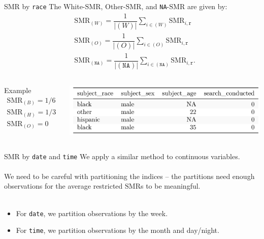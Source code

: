 \documentclass[11pt]{beamer}
\newcommand{\SMR}{\mathrm{SMR}}
\newcommand{\race}{\texttt{race}}
\newcommand{\rrr}{\texttt{r}}
\begin{document}
\begin{frame}{SMR by \race}
    The White-$\SMR$, Other-$\SMR$, and \texttt{NA}-$\SMR$ are given by:
    \begin{align*}
    &\SMR_{(W)} = \dfrac{1}{ |(W)| } \sum_{i \in (W)} \SMR_{i, \rrr} \\
    &\SMR_{(O)} = \dfrac{1}{ |(O)| } \sum_{i \in (O)} \SMR_{i, \rrr} \\
    &\SMR_{(\texttt{NA})} = \dfrac{1}{ |(\texttt{NA})| } \sum_{i \in (\texttt{NA})} \SMR_{i, \rrr}.
    \end{align*}
    \begin{columns}
        Example
            \begin{gather*}
    	    \SMR_{(B)} = 1/6 \\
	    \SMR_{(H)} = 1/3 \\
	    \SMR_{(O)} = 0 \\
	    \end{gather*}
	    \begin{center}
	    \includegraphics[scale = 0.6]{fig/toyoak.png}
	    \end{center}
    \end{columns}
\end{frame}

\begin{frame}{SMR by \texttt{date} and \texttt{time}}
	We apply a similar method to continuous variables.
	\\~\\
	We need to be careful with partitioning the indices -- the partitions need enough observations for the average restricted $\SMR$s to be meaningful.
	\\~\\ \pause
	\begin{itemize}
	\item For \texttt{date}, we partition observations by the week.
	\item For \texttt{time}, we partition observations by the month and day/night.
	\end{itemize}
	
	
	
\end{frame}
\end{document}
